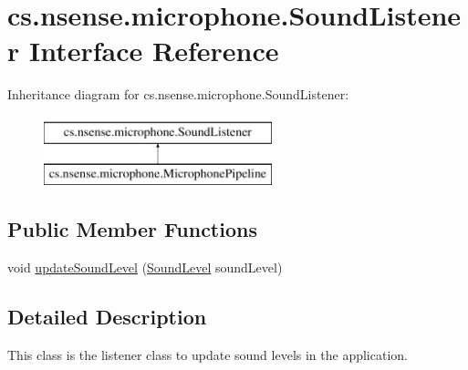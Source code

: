 \hypertarget{interfacecs_1_1nsense_1_1microphone_1_1_sound_listener}{\section{cs.\-nsense.\-microphone.\-Sound\-Listener Interface Reference}
\label{interfacecs_1_1nsense_1_1microphone_1_1_sound_listener}
}
Inheritance diagram for cs.\-nsense.\-microphone.\-Sound\-Listener\-:\begin{figure}[H]
\begin{center}
\leavevmode
\includegraphics[height=2.000000cm]{interfacecs_1_1nsense_1_1microphone_1_1_sound_listener}
\end{center}
\end{figure}
\subsection*{Public Member Functions}
\begin{DoxyCompactItemize}
\item 
void \hyperlink{interfacecs_1_1nsense_1_1microphone_1_1_sound_listener_a4805f7c35514efbcb6ee9b756d1aab35}{update\-Sound\-Level} (\hyperlink{classcs_1_1nsense_1_1microphone_1_1_sound_level}{Sound\-Level} sound\-Level)
\end{DoxyCompactItemize}


\subsection{Detailed Description}
This class is the listener class to update sound levels in the application. 

